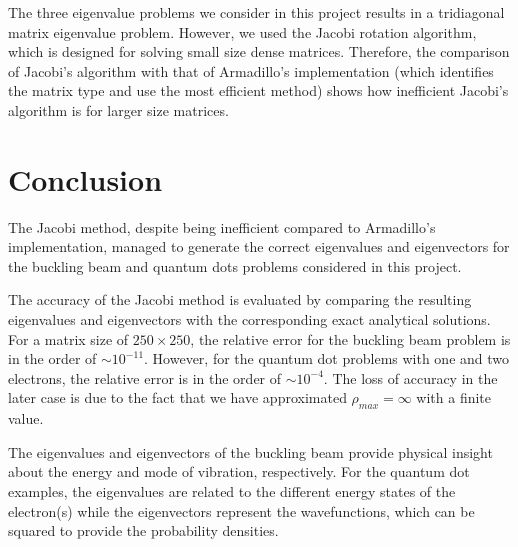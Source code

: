 \documentclass[a4paper]{article}
\begin{document}

The three eigenvalue problems we consider in this project results in a tridiagonal matrix eigenvalue problem. However, we used the Jacobi rotation algorithm, which is designed for solving small size dense matrices. Therefore, the comparison of Jacobi's algorithm with that of Armadillo's implementation (which identifies the matrix type and use the most efficient method) shows how inefficient Jacobi's algorithm is for larger size matrices.

\section{Conclusion}
The Jacobi method, despite being inefficient compared to Armadillo's implementation, managed to generate the correct eigenvalues and eigenvectors for the buckling beam and quantum dots problems considered in this project. 

The accuracy of the Jacobi method is evaluated by comparing the resulting eigenvalues and eigenvectors with the corresponding exact analytical solutions. For a matrix size of $250\times 250$, the relative error for the buckling beam problem is in the order of $\sim10^{-11}$. However, for the quantum dot problems with one and two electrons, the relative error is in the order of $\sim10^{-4}$. The loss of accuracy in the later case is due to the fact that we have approximated $\rho_{max} = \infty$ with a finite value.

The eigenvalues and eigenvectors of the buckling beam provide physical insight about the energy and mode of vibration, respectively. For the quantum dot examples, the eigenvalues are related to the different energy states of the electron(s) while the eigenvectors represent the wavefunctions, which can be squared to provide the probability densities.

%
%


\end{document}

